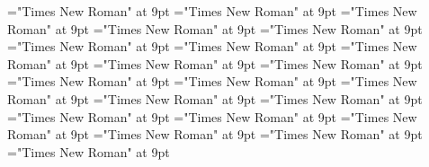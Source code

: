 \documentclass[gps1,twoside]{article}
\begin{document}
\font\spanabbreviationsemanticdomainsemanticdomainssensesensessensesensessubentrysubentriesentrylastchildafter="Times New Roman" at 9pt
\font\namesemanticdomainsemanticdomainssensesensessensesensessubentrysubentriesentrybefore="Times New Roman" at 9pt
\font\academicdomainacademicdomainacademicdomainssensesensessensesensessubentrysubentriesentrybefore="Times New Roman" at 9pt
\font\academicdomainssensesensessensesensessubentrysubentriesentrybefore="Times New Roman" at 9pt
\font\academicdomainssensesensessensesensessubentrysubentriesentryafter="Times New Roman" at 9pt
\font\abbreviationacademicdomainacademicdomainssensesensessensesensessubentrysubentriesentrybefore="Times New Roman" at 9pt
\font\nameacademicdomainacademicdomainssensesensessensesensessubentrysubentriesentrybefore="Times New Roman" at 9pt
\font\spannameacademicdomainacademicdomainssensesensessensesensessubentrysubentriesentryfirstchildbefore="Times New Roman" at 9pt
\font\spannameacademicdomainacademicdomainssensesensessensesensessubentrysubentriesentrylastchildafter="Times New Roman" at 9pt
\font\usageusageusagessensesensessensesensessubentrysubentriesentrybefore="Times New Roman" at 9pt
\font\usagessensesensessensesensessubentrysubentriesentrybefore="Times New Roman" at 9pt
\font\usagessensesensessensesensessubentrysubentriesentryafter="Times New Roman" at 9pt
\font\abbreviationusageusagessensesensessensesensessubentrysubentriesentrybefore="Times New Roman" at 9pt
\font\visiblecomplexformbackrefvisiblecomplexformbackrefvisiblecomplexformbackrefssensesensessensesensessubentrysubentriesentrybefore="Times New Roman" at 9pt
\font\visiblecomplexformbackrefssensesensessensesensessubentrysubentriesentryafter="Times New Roman" at 9pt
\font\complexformtypesvisiblecomplexformbackrefvisiblecomplexformbackrefssensesensessensesensessubentrysubentriesentryafter="Times New Roman" at 9pt
\font\reverseabbrcomplexformtypecomplexformtypesvisiblecomplexformbackrefvisiblecomplexformbackrefssensesensessensesensessubentrysubentriesentrybefore="Times New Roman" at 9pt
\font\headwordvisiblecomplexformbackrefvisiblecomplexformbackrefssensesensessensesensessubentrysubentriesentrybefore="Times New Roman" at 9pt
\font\owningentrysummarydefinitionvisiblecomplexformbackrefvisiblecomplexformbackrefssensesensessensesensessubentrysubentriesentrybefore="Times New Roman" at 9pt
\font\spanowningentrysummarydefinitionvisiblecomplexformbackrefvisiblecomplexformbackrefssensesensessensesensessubentrysubentriesentryfirstchildbefore="Times New Roman" at 9pt
\font\spanowningentrysummarydefinitionvisiblecomplexformbackrefvisiblecomplexformbackrefssensesensessensesensessubentrysubentriesentrylastchildafter="Times New Roman" at 9pt
\end{document}
